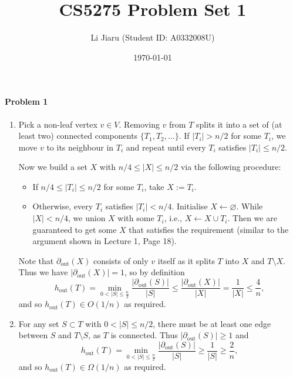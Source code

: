 \documentclass[12pt]{article}
\title{CS5275 Problem Set 1}
\author{Li Jiaru (Student ID: A0332008U)}
\date{\today}
\begin{document}
\maketitle
\paragraph{Problem 1}
\begin{enumerate}[label=\alph*., font=\bfseries]
\item
Pick a non-leaf vertex $v\in V$. Removing $v$ from $T$ splits it into a set of (at least two) connected components $\{T_1, T_2, \dots\}$. If $|T_i|>n/2$ for some $T_i$, we move $v$ to its neighbour in $T_i$ and repeat until every $T_i$ satisfies $|T_i|\le n/2$.

Now we build a set $X$ with $n/4\le |X|\le n/2$ via the following procedure:
\begin{itemize}
\item If $n/4\le |T_i|\le n/2$ for some $T_i$, take $X:=T_i$.
\item Otherwise, every $T_i$ satisfies $|T_i|<n/4$. Initialise $X\leftarrow\varnothing$. While $|X|<n/4$, we union $X$ with some $T_i$, i.e., $X\leftarrow X\cup T_i$. Then we are guaranteed to get some $X$ that satisfies the requirement (similar to the argument shown in Lecture 1, Page 18).
\end{itemize}
Note that $\partial_{\mathrm{out}}(X)$ consists of only $v$ itself as it splits $T$ into $X$ and $T\setminus X$. Thus we have $|\partial_{\mathrm{out}}(X)|=1$, so by definition \[h_{\mathrm{out}}(T)=\min_{0<|S|\le\frac{n}{2}}\frac{|\partial_{\mathrm{out}}(S)|}{|S|}\le\frac{|\partial_{\mathrm{out}}(X)|}{|X|}=\dfrac{1}{|X|}\le\dfrac{4}{n},\]
and so $h_{\mathrm{out}}(T)\in O(1/n)$ as required.
\item
For any set $S\subset T$ with $0<|S|\le n/2$, there must be at least one edge between $S$ and $T\setminus S$, as $T$ is connected. Thus $|\partial_{\mathrm{out}}(S)|\ge 1$ and \[h_{\mathrm{out}}(T)=\min_{0<|S|\le\frac{n}{2}}\frac{|\partial_{\mathrm{out}}(S)|}{|S|}\ge\frac{1}{|S|}\ge\dfrac{2}{n},\]
and so $h_{\mathrm{out}}(T)\in \Omega(1/n)$ as required.
\end{enumerate}
\end{document}
